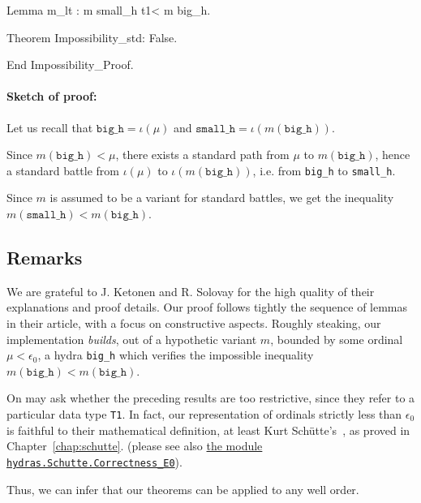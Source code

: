 \begin{Coqsrc}
  Lemma m_lt : m small_h  t1< m big_h.

  Theorem Impossibility_std: False.

End Impossibility_Proof.
\end{Coqsrc}




\paragraph*{Sketch of proof:} Let us recall that $\texttt{big\_h} = \iota(\mu)$
 and $\texttt{small\_h} = \iota (m (\texttt{big\_h}))$.

Since $m(\texttt{big\_h})< \mu$, there exists a standard path from $\mu$ to
$m(\texttt{big\_h})$, hence a   standard battle from $\iota(\mu)$  to
$\iota(m(\texttt{big\_h}))$,  i.e. from \texttt{big\_h} to \texttt{small\_h}.

Since $m$ is assumed to be a variant for standard battles, we get the inequality  $m(\texttt{small\_h}) < m(\texttt{big\_h})$.





\subsection{Remarks}

We are grateful to 
 J. Ketonen and R. Solovay  for the high quality of their explanations and proof details.
Our proof follows tightly the sequence of lemmas in their article, with a focus on 
constructive aspects.
Roughly steaking, our implementation \emph{builds}, out of a hypothetic 
  variant $m$, bounded by some ordinal $\mu<\epsilon_0$, a hydra \texttt{big\_h} which verifies the impossible inequality  $m(\texttt{big\_h})< m(\texttt{big\_h})$.



On may ask whether the preceding results are too restrictive, since they 
refer to a particular data type \texttt{T1}.
In fact, our representation of ordinals strictly less than 
 $\epsilon_0$ is faithful to their mathematical definition, at least 
Kurt Schütte's~\cite{schutte}, as proved in Chapter~\vref{chap:schutte}.
(please see also \href{../theories/html/hydras.Schutte.Correctness_E0.html}{the module \texttt{hydras.Schutte.Correctness\_E0}}).

Thus, we can infer that our theorems can be applied to any well order.

